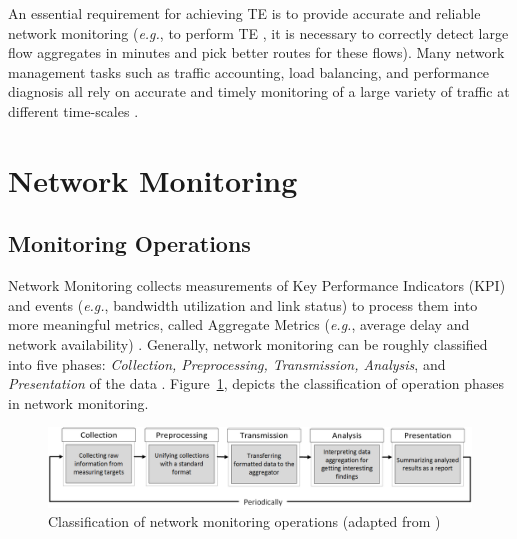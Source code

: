 An essential requirement for achieving TE is to provide accurate and reliable network monitoring (\textit{e.g.}, to perform TE \cite{al_2010:hedera}, it is necessary to correctly detect large flow aggregates in minutes and pick better routes for these flows). Many network management tasks such as traffic accounting, load balancing, and performance diagnosis all rely on accurate and timely monitoring of a large variety of traffic at different time-scales \cite{machado_2014:towards_SLA_Policy,tangari_2017:decentralized_monitoring,al_2010:hedera,benson_2011:microte}. 

\section{Network Monitoring}
\label{sec:background-ntm}

\subsection{Monitoring Operations}
\label{subsec:monitoring-operations}

Network Monitoring collects measurements of Key Performance Indicators (KPI) and events (\textit{e.g.}, bandwidth utilization and link status) to process them into more meaningful metrics, called Aggregate Metrics (\textit{e.g.}, average delay and network availability) \cite{mohan2011:active_passive}. Generally, network monitoring can be roughly classified into five phases: \textit{Collection, Preprocessing, Transmission, Analysis}, and \textit{Presentation} of the data \cite{tsai_2018:network_monitoring_review}. Figure~\ref{fig:monitoring_phases}, depicts the classification of operation phases in network monitoring.

\begin{figure}[!ht]
    \centering
    \includegraphics[scale=0.37]{figures/NetworMonitoringPhases}
    \caption{Classification of network monitoring operations (adapted from \cite{tsai_2018:network_monitoring_review})}
    \label{fig:monitoring_phases}
\end{figure}

